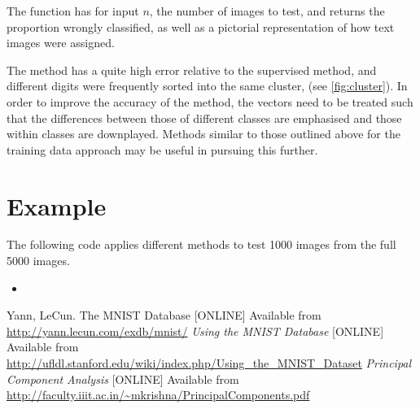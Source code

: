 \documentclass[12pt]{article}
\newcommand{\insertcode}[2]{\begin{itemize}\item[]\end{itemize}} %
\begin{document}
The function has for input \(n\), the number of images to test, and returns the proportion wrongly classified, as well as a pictorial representation of how text images were assigned.



The method has a quite high error relative to the supervised method, and different digits were frequently sorted into the same cluster, (see \ref{fig:cluster}). In order to improve the accuracy of the method, the vectors need to be treated such that the differences between those of different classes are emphasised and those within classes are downplayed. Methods similar to those outlined above for the training data approach may be useful in pursuing this further.

\section{Example}

The following code applies different methods to test 1000 images from the full 5000 images.

\insertcode{"/home/user/KiradjievKrisBeckerlegMel/Example.m"}{Find error and processing times for different methods.} 


\begin{thebibliography}{9}
Yann, LeCun. The MNIST Database [ONLINE] Available from \url{http://yann.lecun.com/exdb/mnist/}
\emph{Using the MNIST Database} [ONLINE] Available from \url{http://ufldl.stanford.edu/wiki/index.php/Using_the_MNIST_Dataset}
\emph{Principal Component Analysis} [ONLINE] Available from \url{http://faculty.iiit.ac.in/~mkrishna/PrincipalComponents.pdf}
\end{thebibliography}
\end{document}
